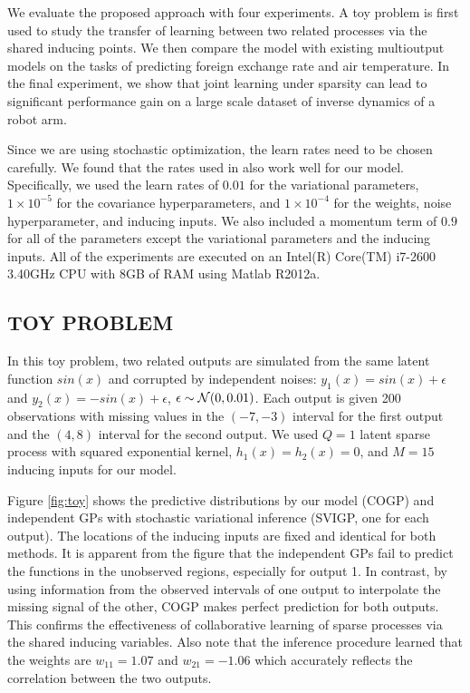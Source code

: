 We evaluate the proposed approach with four experiments.
A toy problem is first used to study the transfer of learning between two related processes via the shared inducing points.
We then compare the model with existing multioutput models on the tasks of predicting foreign exchange rate and air temperature.
In the final experiment, we show that joint learning under sparsity can lead to significant performance gain on a large scale dataset of inverse dynamics of a robot arm. 

Since we are using stochastic optimization, the learn rates need to be chosen carefully.
We found that the rates used in \citep{hensmangaussian} also work well for our model.
Specifically, we used the learn rates of $0.01$ for the variational parameters, $1 \times 10^{-5}$ for the  covariance hyperparameters, and $1 \times 10^{-4}$ for the weights, noise hyperparameter, and inducing inputs.
We also included a momentum term of $0.9$ for all of the parameters except the variational parameters and the inducing inputs.
All of the experiments are executed on an Intel(R) Core(TM) i7-2600 3.40GHz CPU with 8GB of RAM using Matlab R2012a.

\subsection{TOY PROBLEM}
In this toy problem, two related outputs are simulated from the same latent function $sin(x)$ and corrupted by independent noises: $y_1(x) = sin(x) + \epsilon$ and $y_2(x) = -sin(x) + \epsilon$, $\epsilon \sim \mathcal{N}(0,0.01)$.
Each output is given 200 observations with missing values in the $(-7,-3)$ interval for the first output and the $(4,8)$ interval for the second output.
We used $Q = 1$ latent sparse process with squared exponential kernel, $h_1(x) = h_2(x) = 0$, and $M = 15$ inducing inputs for our model.

Figure \ref{fig:toy} shows the predictive distributions by our model (COGP) and independent GPs with stochastic variational inference (SVIGP, one for each output).
The locations of the inducing inputs are fixed and identical for both methods.
It is apparent from the figure that the independent GPs fail to predict the functions in the unobserved regions, especially for output 1.
In contrast, by using information from the observed intervals of one output to interpolate the missing signal of the other, COGP makes perfect prediction for both outputs.
This confirms the effectiveness of collaborative learning of sparse processes via the shared inducing variables. 
Also note that the inference procedure learned that the weights are $w_{11} = 1.07$ and $w_{21} = -1.06$ which accurately reflects the correlation between the two outputs.

